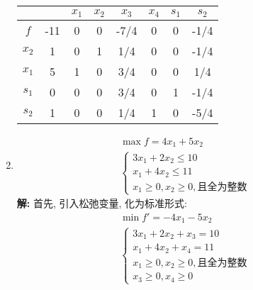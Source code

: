 \documentclass[11pt,AutoFakeBold]{article}
\begin{document}
\begin{enumerate}
\begin{table}[!htbp]
{\begin{tabular}{c|c|cccccc}
        \toprule
        \hline
                &   & $x_1$ & $x_2$ & $x_3$ & $x_4$ &$s_1$&$s_2$ \\ 
        \hline
        $f$    & -11 & 0   & 0    & -7/4    & 0  &0  &-1/4  \\ 
        \hline
        $x_2$ & 1 & 0    & 1& 1/4 & 0 &0 &-1/4   \\ 
        $x_1$ & 5 &1    & 0& 3/4 & 0  &0  &1/4 \\ 
        $s_1$ & 0& 0&0 &3/4      &0     &1      &-1/4\\
        $s_2$ &1    &0  &0     &1/4      &1      &0      &-5/4\\
        \hline
        \bottomrule
        \end{tabular}}
        \end{table}

\item $$\begin{array}{l}
        \max f=4 x_{1}+5 x_{2} \\
        \left\{\begin{array}{l}
        3 x_{1}+2 x_{2} \leqslant 10 \\
        x_{1}+4 x_{2} \leqslant 11 \\
        x_{1} \geqslant 0, x_{2} \geqslant 0, \text {且全为整数 }
        \end{array}\right.
        \end{array}$$
 \textbf{解:}
 首先, 引入松弛变量, 化为标准形式:
 $$\begin{array}{l}
\min f'=-4 x_{1}-5 x_{2} \\
\left\{\begin{array}{l}
3 x_{1}+2 x_{2} +x_3= 10 \\
x_{1}+4 x_{2} +x_4= 11 \\
x_{1} \geqslant 0, x_{2} \geqslant 0, \text {且全为整数 }\\
x_{3} \geqslant 0, x_{4} \geqslant 0
\end{array}\right.
\end{array}$$


\end{enumerate}
\end{document}
